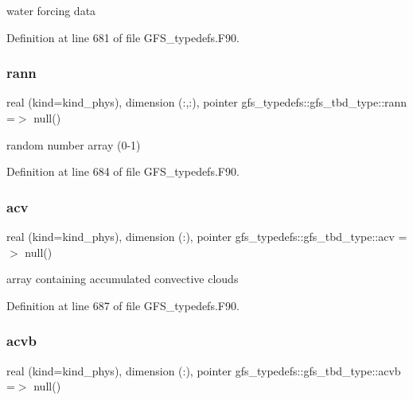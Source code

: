 water forcing data 



Definition at line 681 of file G\+F\+S\+\_\+typedefs.\+F90.

\mbox{\label{structgfs__typedefs_1_1gfs__tbd__type_a0bbdfcefd94587e075c8ccd35f81cd84}} 
\subsubsection{rann}
{\footnotesize\ttfamily real (kind=kind\+\_\+phys), dimension     (\+:,\+:), pointer gfs\+\_\+typedefs\+::gfs\+\_\+tbd\+\_\+type\+::rann =$>$ null()}



random number array (0-\/1) 



Definition at line 684 of file G\+F\+S\+\_\+typedefs.\+F90.

\mbox{\label{structgfs__typedefs_1_1gfs__tbd__type_a33ac8eb3b880b53c36bc7bd73b95f2f7}} 
\subsubsection{acv}
{\footnotesize\ttfamily real (kind=kind\+\_\+phys), dimension      (\+:), pointer gfs\+\_\+typedefs\+::gfs\+\_\+tbd\+\_\+type\+::acv =$>$ null()}



array containing accumulated convective clouds 



Definition at line 687 of file G\+F\+S\+\_\+typedefs.\+F90.

\mbox{\label{structgfs__typedefs_1_1gfs__tbd__type_ae1392b666e116068fc578b84c1900fbf}} 
\subsubsection{acvb}
{\footnotesize\ttfamily real (kind=kind\+\_\+phys), dimension     (\+:), pointer gfs\+\_\+typedefs\+::gfs\+\_\+tbd\+\_\+type\+::acvb =$>$ null()}



